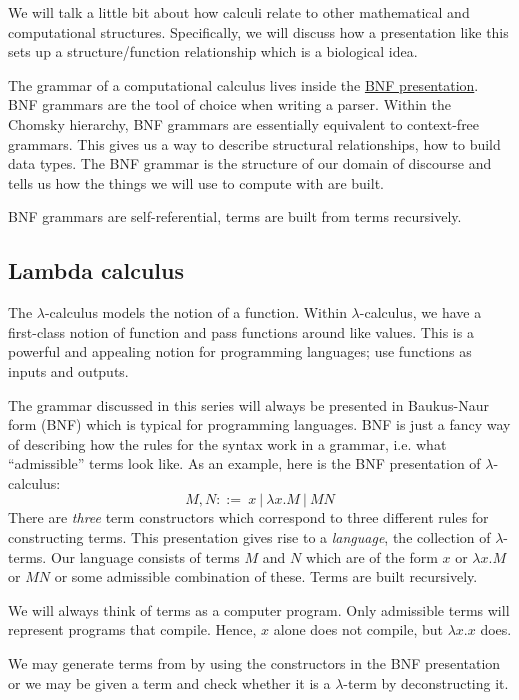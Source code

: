 \documentclass[12pt]{article}
\numberwithin{equation}{section}
\begin{document}
We will talk a little bit about how calculi relate to other mathematical and computational structures. Specifically, we will discuss how a presentation like this sets up a structure/function relationship which is a biological idea.

The grammar of a computational calculus lives inside the \href{https://blog.rchain.coop/computational-calculi-primer/}{BNF presentation}. BNF grammars are the tool of choice when writing a parser. Within the Chomsky hierarchy, BNF grammars are essentially equivalent to context-free grammars. This gives us a way to describe structural relationships, how to build data types. The BNF grammar is the structure of our domain of discourse and tells us how the things we will use to compute with are built.

BNF grammars are self-referential, terms are built from terms recursively.

\subsection{Lambda calculus}
The $\lambda$-calculus models the notion of a function. Within $\lambda$-calculus, we have a first-class notion of function and pass functions around like values. This is a powerful and appealing notion for programming languages; use functions as inputs and outputs.

The grammar discussed in this series will always be presented in Baukus-Naur form (BNF) which is typical for programming languages. BNF is just a fancy way of describing how the rules for the syntax work in a grammar, i.e. what ``admissible'' terms look like. As an example, here is the BNF presentation of $\lambda$-calculus:
\begin{equation} \label{bnfl}
M, N ::= \ x \ | \ \lambda x.M \ | \ M N
\end{equation}
There are \emph{three} term constructors which correspond to three different rules for constructing terms. This presentation gives rise to a \emph{language}, the collection of $\lambda$-terms. Our language consists of terms $M$ and $N$ which are of the form $x$ or $\lambda x. M$ or $M N$ or some admissible combination of these. Terms are built recursively.

We will always think of terms as a computer program. Only admissible terms will represent programs that compile. Hence, $x$ alone does not compile, but $\lambda x.x$ does.

We may generate terms from by using the constructors in the BNF presentation or we may be given a term and check whether it is a $\lambda$-term by deconstructing it.
\end{document}
